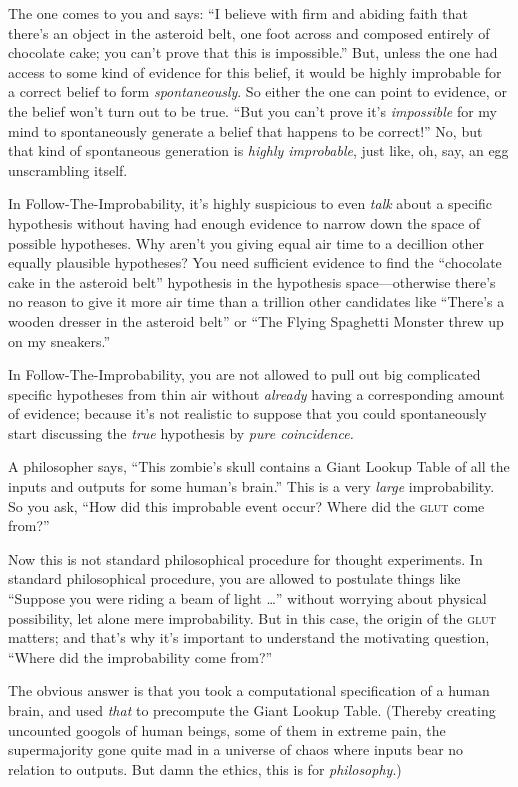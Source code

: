 {
 The one comes to you and says: ``I believe with
firm and abiding faith that there's an object in the
asteroid belt, one foot across and composed entirely of chocolate cake;
you can't prove that this is
impossible.'' But, unless the one had access to some
kind of evidence for this belief, it would be highly improbable for a
correct belief to form \textit{spontaneously}. So either the one can
point to evidence, or the belief won't turn out to be
true. ``But you can't prove
it's \textit{impossible} for my mind to spontaneously
generate a belief that happens to be correct!'' No,
but that kind of spontaneous generation is \textit{highly improbable},
just like, oh, say, an egg unscrambling itself.}

{
 In Follow-The-Improbability, it's highly
suspicious to even \textit{talk} about a specific hypothesis without
having had enough evidence to narrow down the space of possible
hypotheses. Why aren't you giving equal air time to a
decillion other equally plausible hypotheses? You need sufficient
evidence to find the ``chocolate cake in the asteroid
belt'' hypothesis in the hypothesis space---otherwise
there's no reason to give it more air time than a
trillion other candidates like
``There's a wooden dresser in the
asteroid belt'' or ``The Flying
Spaghetti Monster threw up on my sneakers.''}

{
 In Follow-The-Improbability, you are not allowed to pull out big
complicated specific hypotheses from thin air without \textit{already}
having a corresponding amount of evidence; because it's
not realistic to suppose that you could spontaneously start discussing
the \textit{true} hypothesis by \textit{pure coincidence.}}

{
 A philosopher says, ``This
zombie's skull contains a Giant Lookup Table of all the
inputs and outputs for some human's
brain.'' This is a very \textit{large} improbability.
So you ask, ``How did this improbable event occur?
Where did the \textsc{glut} come from?''}

{
 Now this is not standard philosophical procedure for thought
experiments. In standard philosophical procedure, you are allowed to
postulate things like ``Suppose you were riding a beam
of light \ldots'' without worrying about physical
possibility, let alone mere improbability. But in this case, the origin
of the \textsc{glut} matters; and that's why
it's important to understand the motivating question,
``Where did the improbability come
from?''}

{
 The obvious answer is that you took a computational specification
of a human brain, and used \textit{that} to precompute the Giant Lookup
Table. (Thereby creating uncounted googols of human beings, some of
them in extreme pain, the supermajority gone quite mad in a universe of
chaos where inputs bear no relation to outputs. But damn the ethics,
this is for \textit{philosophy}.)}

